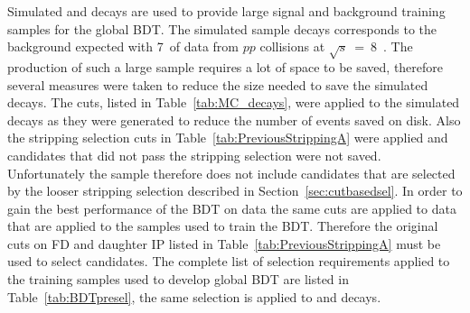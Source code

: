 Simulated \bsmumu and \bbbarmumux decays are used to provide large signal and background training samples for the global BDT. %
The simulated sample \bbbarmumux decays corresponds to the background expected with 7~\fb of data from $pp$ collisions at $\sqrt{s}$~=~8~\tev. The production of such a large sample requires a lot of space to be saved, therefore several measures were taken to reduce the size needed to save the simulated \bbbarmumux decays. The cuts, listed in Table~\ref{tab:MC_decays}, were applied to the simulated decays as they were generated to reduce the number of events saved on disk. Also the stripping selection cuts in Table~\ref{tab:PreviousStrippingA} were applied and candidates that did not pass the stripping selection were not saved. Unfortunately the \bbbarmumux sample therefore does not include candidates that are selected by the looser stripping selection described in Section~\ref{sec:cutbasedsel}. In order to gain the best performance of the BDT on data the same cuts are applied to data that are applied to the samples used to train the BDT. Therefore the original cuts on FD \chisqd and daughter IP \chisqd listed in Table~\ref{tab:PreviousStrippingA} must be used to select \bsmumu candidates. 
The complete list of selection requirements applied to the training samples used to develop global BDT are listed in Table~\ref{tab:BDTpresel}, the same selection is applied to \bsmumu and \bbbarmumux decays.  
